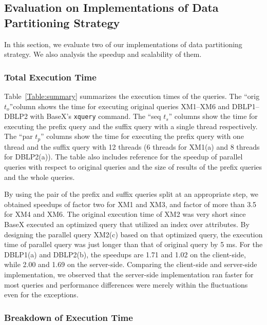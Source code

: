 \subsection{Evaluation on Implementations of Data Partitioning Strategy}

In this section, we evaluate two of our implementations of data partitioning
strategy. We also analysis the speedup and scalability of them.

\subsubsection{Total Execution Time}



Table~\ref{Table:summary} summarizes the execution times of the queries. The
``orig $t_o$''column shows the time for executing original queries XM1--XM6 and
DBLP1--DBLP2 with BaseX's \verb|xquery| command. The ``seq $t_s$'' columns show
the time for executing the prefix query and the suffix query with a single
thread respectively. The ``par $t_p$'' columns show the time for executing the
prefix query with one thread and the suffix query with 12 threads (6 threads for
XM1(a) and 8 threads for DBLP2(a)).  The table also includes reference for the
speedup of parallel queries with respect to original queries and the size of
results of the prefix queries and the whole queries.

By using the pair of the prefix and suffix queries split at an appropriate step,
we obtained speedups of factor two for XM1 and XM3, and factor of more than 3.5
for XM4 and XM6. The original execution time of XM2 was very short since BaseX
executed an optimized query that utilized an index over attributes. By designing
the parallel query XM2(c) based on that optimized query, the execution time of
parallel query was just longer than that of original query by 5 ms. For the
DBLP1(a) and DBLP2(b), the speedups are 1.71 and 1.02 on the client-side, while
2.00 and  1.69 on the server-side. Comparing the client-side and server-side
implementation, we observed that the server-side implementation ran faster for
most queries and performance differences were merely within the fluctuations
even for the exceptions.

\subsubsection{Breakdown of Execution Time}



